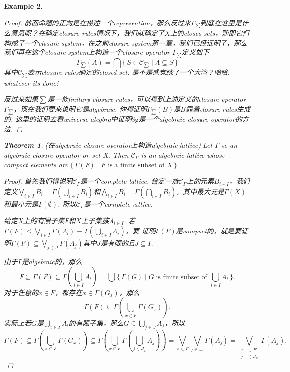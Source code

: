 \documentclass{article}
\newtheorem{theorem}{Theorem}[section]
\newtheorem{example}[theorem]{Example}
\newcommand\Set[2]{\{\,#1\mid#2\,\}} %
\newcommand\SET[2]{\Set{#1}{\text{#2}}} %
\begin{document}
\begin{example}
\begin{proof}
前面命题的正向是在描述一个represention，那么反过来$\Gamma_{\sum}$到底在这里是什么意思呢？在确定closure rules情况下，我们就确定了$X$上的closed sets，随即它们构成了一个closure system，在之前closure system那一章，我们已经证明了，那么我们再在这个closure system上构造一个closure operator $\Gamma_{\sum}$定义如下
$$
\Gamma_{\sum}(A) = \bigcap \Set{S \in \mathcal{C}_{\sum}}{ A \subseteq S}
$$
其中$\mathcal{C}_{\sum}$表示closure rules确定的closed set. 是不是感觉绕了一个大湾？哈哈. whatever its done!

反过来如果$\sum$是一族finitary closure rules，可以得到上述定义的closure operator $\Gamma_{\sum}$，现在我们要来说明它是algebraic. 你得证明$\Gamma_{\sum}(B)$是$B$靠着closure rules生成的. 这里的证明去看universe alegbra中证明$\text{Sg}$是一个algebraic closure operator的方法.
\end{proof}

\newpage
\begin{theorem}
\rm {\color{red} (在algebraic closure operator上构造algebraic lattice)} Let $\Gamma$ be an algebraic closure operator on set $X$. Then $\mathcal{C}_\Gamma$ is an algebraic lattice whose compact elements are $\SET{\Gamma(F)}{$F$ is a finite subset of $X$}$.
\end{theorem}

\begin{proof}
首先我们得说明$\mathcal{C}_\Gamma$是一个complete lattice. 给定一族$\mathcal{C}_\Gamma$上的元素$B_{i \in I}$，我们定义$\bigvee\limits_{i \in I} B_i = \Gamma(\bigcup\limits_{i \in I} B_i)$和$\bigwedge_{i \in I} B_i = \Gamma(\bigcap_{i \in I} B_i)$，其中最大元是$\Gamma(X)$和最小元是$\Gamma(\emptyset)$. 所以$\mathcal{C}_{\Gamma}$是一个complete lattice.


给定$X$上的有限子集$F$和$X$上子集族$A_{i \in I}$. 若$\Gamma(F) \leq \bigvee\limits_{i\in I}\Gamma(A_i) = \Gamma(\bigcup\limits_{i\in I} A_i)$，要{\color{red} 证明$\Gamma(F)$是compact的，就是要证明$\Gamma(F) \subseteq \bigvee\limits_{j \in J} \Gamma(A_j)$其中$J$是有限的且$J \subseteq I$}.

由于$\Gamma$是algebraic的，那么
$$
F \subseteq \Gamma(F) \subseteq \Gamma(\bigcup\limits_{i\in I} A_i) = \bigcup\SET{\Gamma(G)}{$G$ is finite subset of $\bigcup\limits_{i\in I} A_i$}.
$$
对于任意的$x \in F$，都存在$x \in \Gamma(G_x)$，那么
$$
\Gamma(F) \subseteq \Gamma(\bigcup\limits_{x \in F}\Gamma(G_x)).
$$
实际上若$G$是$\bigcup\limits_{i\in I} A_i$的有限子集，那么$G \subseteq \bigcup\limits_{j\in J} A_j$，所以
$$
\Gamma(F) \subseteq \Gamma(\bigcup\limits_{x \in F}\Gamma(G_x)) \subseteq \Gamma(\bigcup\limits_{x \in F} \Gamma(\bigcup\limits_{j\in J_x} A_j)) = \bigvee\limits_{x \in F} \bigvee\limits_{j\in J_x} \Gamma(A_j) = \bigvee\limits_{\begin{aligned} x &\in F \\ j &\in J_x \end{aligned}} \Gamma(A_j).
$$


\end{proof}
\end{example}
\end{document}
